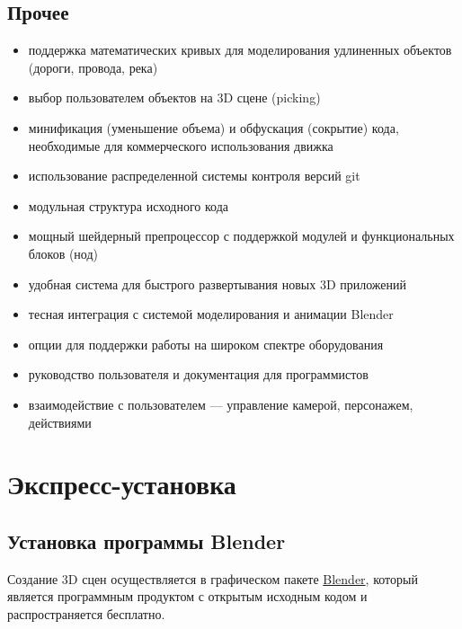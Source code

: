 \documentclass[a4paper,12pt,oneside]{sphinxmanual}
\begin{document}
\section{Прочее}
\label{features:id14}\begin{itemize}
\item {} 
поддержка математических кривых для моделирования удлиненных объектов (дороги, провода, река)

\item {} 
выбор пользователем объектов на 3D сцене (picking)

\item {} 
минификация (уменьшение объема) и обфускация (сокрытие) кода, необходимые для коммерческого использования движка

\item {} 
использование распределенной системы контроля версий git

\item {} 
модульная структура исходного кода

\item {} 
мощный шейдерный препроцессор с поддержкой модулей и функциональных блоков (нод)

\item {} 
удобная система для быстрого развертывания новых 3D приложений

\item {} 
тесная интеграция с системой моделирования и анимации Blender

\item {} 
опции для поддержки работы на широком спектре оборудования

\item {} 
руководство пользователя и документация для программистов

\item {} 
взаимодействие с пользователем — управление камерой, персонажем, действиями

\end{itemize}


\chapter{Экспресс-установка}
\label{first_steps:first-steps}\label{first_steps::doc}\label{first_steps:id1}

\section{Установка программы Blender}
\label{first_steps:first-steps-blender}\label{first_steps:blender}
Создание 3D сцен осуществляется в графическом пакете \href{http://ru.wikipedia.org/wiki/Blender}{Blender}, который является программным продуктом с открытым исходным кодом и распространяется бесплатно.
\end{document}
